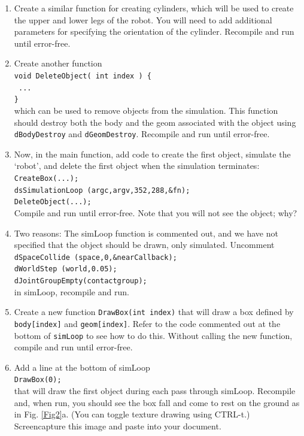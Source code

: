 \documentclass[12pt]{article}
\begin{document}
\begin{enumerate}
\item Create a similar function for creating cylinders, which will be used to create the upper and lower legs of the robot. You will need to add additional parameters for specifying the orientation of the cylinder. Recompile and run until error-free.

\item Create another function \\
\texttt{void DeleteObject( int index ) \{}\\
\texttt{	...}\\
\texttt{\}} \\
which can be used to remove objects from the simulation. This function should destroy both the body and the geom associated with the object using \texttt{dBodyDestroy} and \texttt{dGeomDestroy}. Recompile and run until error-free.

\item Now, in the main function, add code to create the first object, simulate the `robot', and delete the first object when the simulation terminates:\\
\texttt{CreateBox(...);}\\
\texttt{dsSimulationLoop (argc,argv,352,288,\&fn);}\\
\texttt{DeleteObject(...);}\\
Compile and run until error-free. Note that you will not see the object; why?

\item Two reasons: The simLoop function is commented out, and we have not specified that the object should be drawn, only simulated. Uncomment \\
\texttt{dSpaceCollide (space,0,\&nearCallback);}\\
\texttt{dWorldStep (world,0.05);}\\
\texttt{dJointGroupEmpty(contactgroup);}\\
in simLoop, recompile and run.

\item Create a new function \texttt{DrawBox(int index)} that will draw a box defined by \texttt{body[index]} and \texttt{geom[index]}. Refer to the code commented out at the bottom of \texttt{simLoop} to see how to do this. Without calling the new function, compile and run until error-free.

\item Add a line at the bottom of simLoop \\
\texttt{DrawBox(0);}\\
that will draw the first object during each pass through simLoop. Recompile and, when run, you should see the box fall and come to rest on the ground as in Fig. \ref{Fig2}a. (You can toggle texture drawing using CTRL-t.) Screencapture this image and paste into your document.


\end{enumerate}
\end{document}

